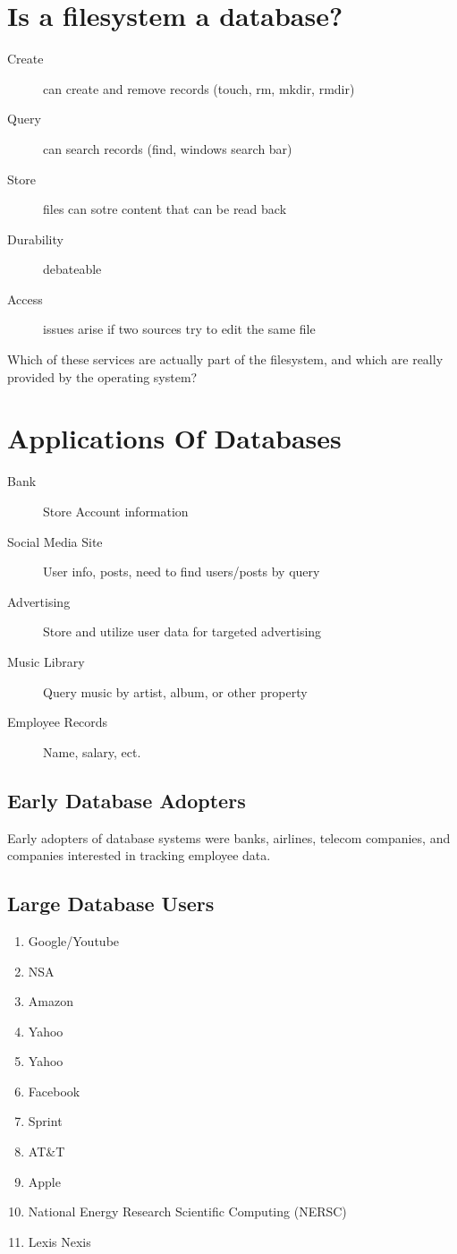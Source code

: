 \documentclass{article}
\begin{document}
\section{Is a filesystem a database?}
\begin{description}
    \item[Create] can create and remove records (touch, rm, mkdir, rmdir)
    \item[Query] can search records (find, windows search bar)
    \item[Store] files can sotre content that can be read back
    \item[Durability] debateable
    \item[Access] issues arise if two sources try to edit the same file
\end{description}
Which of these services are actually part of the filesystem, and which are
really provided by the operating system?

\section{Applications Of Databases}
\begin{description}
    \item[Bank] Store Account information
    \item[Social Media Site] User info, posts, need to find users/posts by query
    \item[Advertising] Store and utilize user data for targeted advertising
    \item[Music Library] Query music by artist, album, or other property
    \item[Employee Records] Name, salary, ect.
\end{description}

\subsection{Early Database Adopters}
Early adopters of database systems were banks, airlines, telecom companies, and
companies interested in tracking employee data.

\subsection{Large Database Users}
\begin{enumerate}
    \item Google/Youtube
    \item NSA
    \item Amazon
    \item Yahoo
    \item Yahoo
    \item Facebook
    \item Sprint
    \item AT\&T
    \item Apple
    \item National Energy Research Scientific Computing (NERSC)
    \item Lexis Nexis
\end{enumerate}
\end{document}

